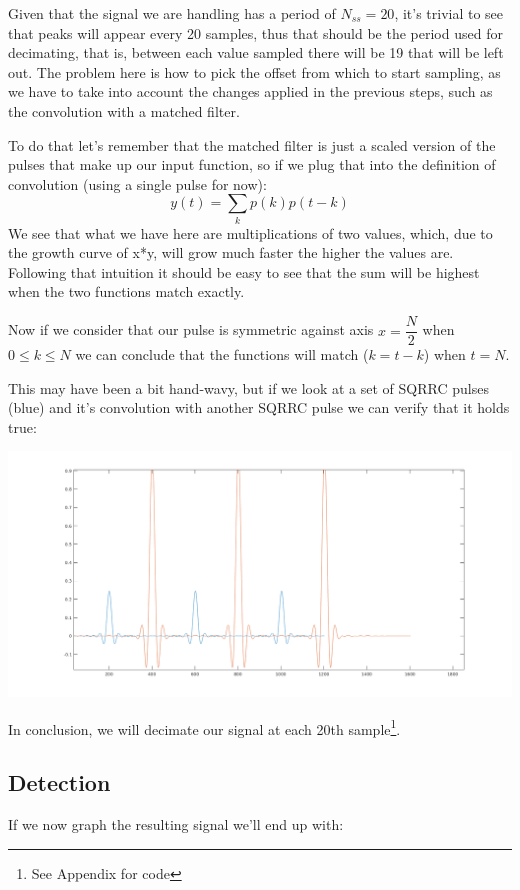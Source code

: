 \documentclass[conference,9pt]{IEEEtran}
\begin{document}
Given that the signal we are handling has a period of $N_{ss}=20$, it's trivial to see that peaks will appear every 20 samples, thus that should be the period used for decimating, that is, between each value sampled there will be 19 that will be left out. The problem here is how to pick the offset from which to start sampling, as we have to take into account the changes applied in the previous steps, such as the convolution with a matched filter.

To do that let's remember that the matched filter is just a scaled version of the pulses that make up our input function, so if we plug that into the definition of convolution\cite{conv} (using a single pulse for now):
$$y(t)=\sum_{k} p(k)p(t-k)$$
We see that what we have here are multiplications of two values, which, due to the growth curve of x*y, will grow much faster the higher the values are. Following that intuition it should be easy to see that the sum will be highest when the two functions match exactly.

Now if we consider that our pulse is symmetric against axis $x=\dfrac{N}{2}$ when $0\leq k\leq N$ we can conclude that the functions will match ($k=t-k$) when $t=N$.

This may have been a bit hand-wavy, but if we look at a set of SQRRC pulses (blue) and it's convolution with another SQRRC pulse we can verify that it holds true:

\includegraphics[scale=0.23]{convs}

In conclusion, we will decimate our signal at each 20th sample\footnote{See Appendix for code}.


\subsection{Detection}
If we now graph the resulting signal we'll end up with:
\end{document}

